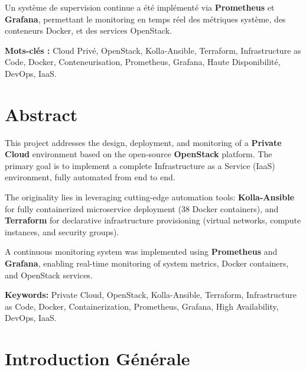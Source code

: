 \documentclass[12pt,a4paper,oneside]{book}
\begin{document}
Un syst\`eme de supervision continue a \'et\'e impl\'ement\'e via \textbf{Prometheus} et \textbf{Grafana}, permettant le monitoring en temps r\'eel des m\'etriques syst\`eme, des conteneurs Docker, et des services OpenStack.

\vspace{0.5cm}
\noindent\textbf{Mots-cl\'es :} Cloud Priv\'e, OpenStack, Kolla-Ansible, Terraform, Infrastructure as Code, Docker, Conteneurisation, Prometheus, Grafana, Haute Disponibilit\'e, DevOps, IaaS.

\chapter*{Abstract}

This project addresses the design, deployment, and monitoring of a \textbf{Private Cloud} environment based on the open-source \textbf{OpenStack} platform. The primary goal is to implement a complete Infrastructure as a Service (IaaS) environment, fully automated from end to end.

The originality lies in leveraging cutting-edge automation tools: \textbf{Kolla-Ansible} for fully containerized microservice deployment (38 Docker containers), and \textbf{Terraform} for declarative infrastructure provisioning (virtual networks, compute instances, and security groups).

A continuous monitoring system was implemented using \textbf{Prometheus} and \textbf{Grafana}, enabling real-time monitoring of system metrics, Docker containers, and OpenStack services.

\vspace{0.5cm}
\noindent\textbf{Keywords:} Private Cloud, OpenStack, Kolla-Ansible, Terraform, Infrastructure as Code, Docker, Containerization, Prometheus, Grafana, High Availability, DevOps, IaaS.

\tableofcontents
\listoffigures
\listoftables

\mainmatter

\chapter{Introduction G\'en\'erale}
\end{document}
